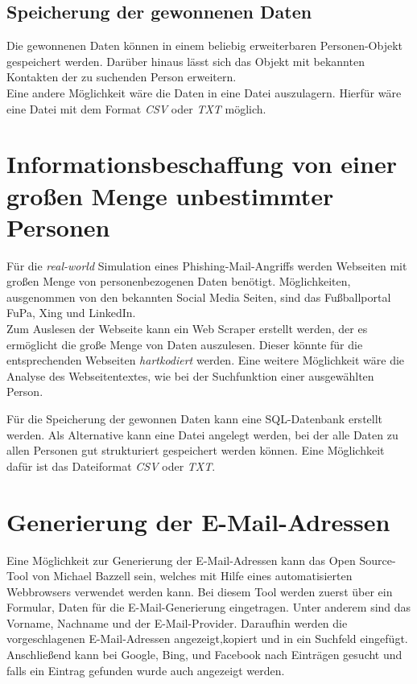 	\subsection{Speicherung der gewonnenen Daten}
	Die gewonnenen Daten können in einem beliebig erweiterbaren Personen-Objekt gespeichert werden. Darüber hinaus lässt sich das Objekt mit bekannten Kontakten der zu suchenden Person erweitern.\\
	Eine andere Möglichkeit wäre die Daten in eine Datei auszulagern. Hierfür wäre eine Datei mit dem Format \textit{CSV} oder \textit{TXT} möglich.
	
\section{Informationsbeschaffung von einer großen Menge unbestimmter Personen}
Für die \textit{real-world} Simulation eines Phishing-Mail-Angriffs werden Webseiten mit großen Menge von personenbezogenen Daten benötigt. Möglichkeiten, ausgenommen von den bekannten Social Media Seiten, sind das Fußballportal FuPa, Xing und LinkedIn.\\
Zum Auslesen der Webseite kann ein Web Scraper erstellt werden, der es ermöglicht die große Menge von Daten auszulesen. Dieser könnte für die entsprechenden Webseiten \textit{hartkodiert} werden. Eine weitere Möglichkeit wäre die Analyse des Webseitentextes, wie bei der Suchfunktion einer ausgewählten Person.

Für die Speicherung der gewonnen Daten kann eine SQL-Datenbank erstellt werden.
Als Alternative kann eine Datei angelegt werden, bei der alle Daten zu allen Personen gut strukturiert gespeichert werden können. Eine Möglichkeit dafür ist das Dateiformat \textit{CSV} oder \textit{TXT}.%


\section{Generierung der E-Mail-Adressen}
Eine Möglichkeit zur Generierung der E-Mail-Adressen kann das Open Source-Tool von Michael Bazzell \cite{EmailAssumptions} sein, welches mit Hilfe eines automatisierten Webbrowsers verwendet werden kann. Bei diesem Tool werden zuerst über ein Formular, Daten für die E-Mail-Generierung eingetragen. Unter anderem sind das Vorname, Nachname und der E-Mail-Provider. Daraufhin werden die vorgeschlagenen E-Mail-Adressen angezeigt,kopiert und in ein Suchfeld eingefügt. Anschließend kann bei Google, Bing, und Facebook nach Einträgen gesucht und falls ein Eintrag gefunden wurde auch angezeigt werden.

